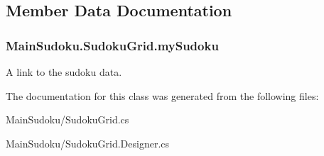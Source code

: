\subsection{Member Data Documentation}
\hypertarget{class_main_sudoku_1_1_sudoku_grid_a2f0a0b1da2830add953ddf9ae8f559f8}{
\subsubsection[{my\-Sudoku}]{ {\bf Main\-Sudoku.\-Sudoku\-Grid.\-my\-Sudoku}}}\label{class_main_sudoku_1_1_sudoku_grid_a2f0a0b1da2830add953ddf9ae8f559f8}


A link to the sudoku data. 



The documentation for this class was generated from the following files\-:\begin{DoxyCompactItemize}
\item 
Main\-Sudoku/Sudoku\-Grid.\-cs\item 
Main\-Sudoku/Sudoku\-Grid.\-Designer.\-cs\end{DoxyCompactItemize}
